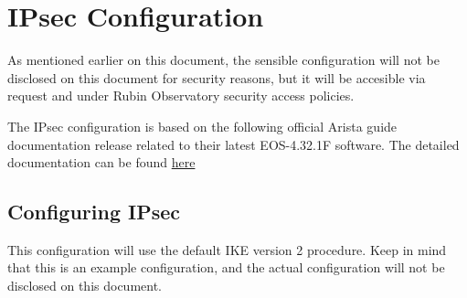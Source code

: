 \section{IPsec Configuration}

As mentioned earlier on this document, the sensible configuration will not be disclosed on this document for security reasons, but it will be accesible via request and under Rubin Observatory security access policies.

The IPsec configuration is based on the following official Arista guide documentation release related to their latest EOS-4.32.1F software. The detailed documentation can be found \href{https://www.arista.com/en/um-eos/eos-data-plane-security#xx1007378}{here}

\subsection{Configuring IPsec}

This configuration will use the default IKE version 2 procedure. Keep in mind that this is an example configuration, and the actual configuration will not be disclosed on this document.

